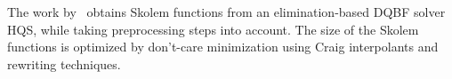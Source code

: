 \documentclass{article}
\begin{document}

The work by~\cite{wimmer2016skolem} obtains Skolem functions from an elimination-based DQBF solver HQS, while taking preprocessing steps into account.
%
The size of the Skolem functions is optimized by don’t-care minimization using Craig interpolants and rewriting techniques.

%


\end{document}
